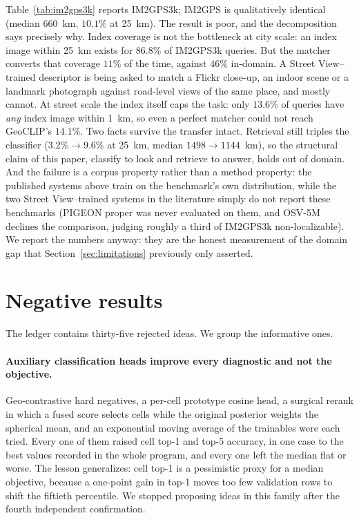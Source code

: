 \documentclass[11pt,a4paper]{article}
\begin{document}
Table~\ref{tab:im2gps3k} reports IM2GPS3k; IM2GPS is qualitatively identical (median
$660$~km, $10.1\%$ at 25~km). The result is poor, and the decomposition says precisely why.
Index coverage is not the bottleneck at city scale: an index image within 25~km exists for
$86.8\%$ of IM2GPS3k queries. But the matcher converts that coverage $11\%$ of the time,
against $46\%$ in-domain. A Street View--trained descriptor is being asked to match a
Flickr close-up, an indoor scene or a landmark photograph against road-level views of the
same place, and mostly cannot. At street scale the index itself caps the task: only $13.6\%$
of queries have \emph{any} index image within 1~km, so even a perfect matcher could not
reach GeoCLIP's $14.1\%$. Two facts survive the transfer intact. Retrieval still triples the
classifier ($3.2\% \to 9.6\%$ at 25~km, median $1498 \to 1144$~km), so the structural claim
of this paper, classify to look and retrieve to answer, holds out of domain. And the
failure is a corpus property rather than a method property: the published systems above
train on the benchmark's own distribution, while the two Street View--trained systems in the
literature simply do not report these benchmarks (PIGEON proper was never evaluated on them,
and OSV-5M \cite{astruc2024osv5m} declines the comparison, judging roughly a third of
IM2GPS3k non-localizable). We report the numbers anyway: they are the honest measurement of
the domain gap that Section~\ref{sec:limitations} previously only asserted.

\section{Negative results}
\label{sec:negatives}

The ledger contains thirty-five rejected ideas. We group the informative ones.

\paragraph{Auxiliary classification heads improve every diagnostic and not the objective.}
Geo-contrastive hard negatives, a per-cell prototype cosine head, a surgical rerank in which
a fused score selects cells while the original posterior weights the spherical mean, and an
exponential moving average of the trainables were each tried. Every one of them raised cell
top-1 and top-5 accuracy, in one case to the best values recorded in the whole program, and
every one left the median flat or worse. The lesson generalizes: cell top-1 is a pessimistic
proxy for a median objective, because a one-point gain in top-1 moves too few validation rows
to shift the fiftieth percentile. We stopped proposing ideas in this family after the fourth
independent confirmation.
\end{document}
